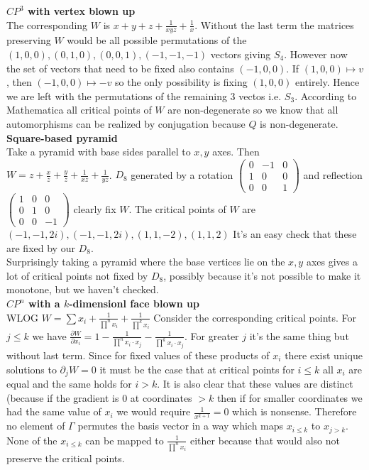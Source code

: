 \documentclass[a4paper]{article}
\begin{document}
\textbf{$CP^3$ with vertex blown up}\\
The corresponding $W$ is $x+y+z+\frac{1}{xyz}+\frac{1}{x}$. Without the last term the matrices preserving $W$ would be all possible permutations of the $(1,0,0),(0,1,0),(0,0,1),(-1,-1,-1)$ vectors giving $S_4$. However now the set of vectors that need to be fixed also contains $(-1,0,0)$. If $(1,0,0)\mapsto v$, then $(-1,0,0)\mapsto -v$ so the only possibility is fixing $(1,0,0)$ entirely. Hence we are left with the permutations of the remaining 3 vectos i.e. $S_3$. According to Mathematica all critical points of $W$ are non-degenerate so we know that all automorphisms can be realized by conjugation because $Q$ is non-degenerate.
\\
 \textbf{Square-based pyramid}\\
 Take a pyramid with base sides parallel to $x,y$ axes. Then $W=z+\frac{x}{z}+\frac{y}{z}+\frac{1}{xz}+\frac{1}{yz}$. $D_8$ generated by a rotation  $\begin{pmatrix} 0 & -1 &0\\ 1 & 0 & 0\\ 0& 0 &1 \end{pmatrix} $ and reflection $\begin{pmatrix} 1 & 0 & 0 \\ 0 & 1 & 0\\ 0 & 0 &-1 \end{pmatrix} $ clearly fix $W$. The critical points of $W$ are $\left( -1,-1,2i \right) ,\left( -1,-1,2i \right), \left( 1,1,-2 \right),\left( 1,1,2 \right) $ 
 It's an easy check that these are fixed by our $D_8$.\\
 Surprisingly taking a pyramid where the base vertices lie on the  $x,y$ axes gives a lot of critical points not fixed by $D_8$, possibly because it's not possible to make it monotone, but we haven't checked.
 \\
\textbf{$CP^{n} $ with a $k$-dimensionl face blown up}
\\WLOG $W=\sum x_{i}+\frac{1}{\prod ^n x_{i}}+\frac{1}{\prod ^k x_{i}}$
Consider the corresponding critical points. For $j\le k$ we have $\frac{\partial W}{\partial x_{i}} =1-\frac{1}{\prod^n x_{i} \cdot  x_{j}} - \frac{1}{\prod^k x_{i} \cdot x_{j}}$. For greater $j$ it's the same thing but without last term. Since for fixed values of these products of $x_{i}$ there exist unique solutions to $\partial_j W=0$ it must be the case that at critical points for $i\le k$ all $x_{i}$ are equal and the same holds for $i>k$. It is also clear that these values are distinct (because if the gradient is 0 at coordinates $>k$ then if for smaller coordinates we had the same value of  $x_{i}$ we would require $\frac{1}{x^{k+1}}=0$ which is nonsense. Therefore no element of $\Gamma $ permutes the basis vector in a way which maps $x_{i\le k}$ to $x_{j>k}$. None of the $x_{i\le k}$ can be mapped to $\frac{1}{\prod^n x_{i}}$ either because that would also not preserve the critical points. 
\end{document}
